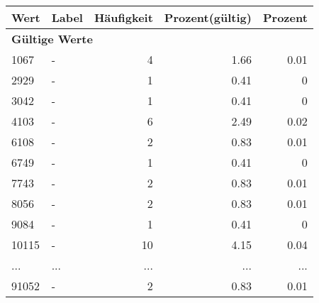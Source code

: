      \begin{longtable}{lXrrr}
     \toprule
     \textbf{Wert} & \textbf{Label} & \textbf{Häufigkeit} & \textbf{Prozent(gültig)} & \textbf{Prozent} \\
     \endhead
     \midrule
     \multicolumn{5}{l}{\textbf{Gültige Werte}}\\
        1067 & \multicolumn{1}{X}{-} & %
          \num{4} &
          \num[round-mode=places,round-precision=2]{1.66} &
          \num[round-mode=places,round-precision=2]{0.01} \\
        2929 & \multicolumn{1}{X}{-} & %
          \num{1} &
          \num[round-mode=places,round-precision=2]{0.41} &
          \num[round-mode=places,round-precision=2]{0} \\
        3042 & \multicolumn{1}{X}{-} & %
          \num{1} &
          \num[round-mode=places,round-precision=2]{0.41} &
          \num[round-mode=places,round-precision=2]{0} \\
        4103 & \multicolumn{1}{X}{-} & %
          \num{6} &
          \num[round-mode=places,round-precision=2]{2.49} &
          \num[round-mode=places,round-precision=2]{0.02} \\
        6108 & \multicolumn{1}{X}{-} & %
          \num{2} &
          \num[round-mode=places,round-precision=2]{0.83} &
          \num[round-mode=places,round-precision=2]{0.01} \\
        6749 & \multicolumn{1}{X}{-} & %
          \num{1} &
          \num[round-mode=places,round-precision=2]{0.41} &
          \num[round-mode=places,round-precision=2]{0} \\
        7743 & \multicolumn{1}{X}{-} & %
          \num{2} &
          \num[round-mode=places,round-precision=2]{0.83} &
          \num[round-mode=places,round-precision=2]{0.01} \\
        8056 & \multicolumn{1}{X}{-} & %
          \num{2} &
          \num[round-mode=places,round-precision=2]{0.83} &
          \num[round-mode=places,round-precision=2]{0.01} \\
        9084 & \multicolumn{1}{X}{-} & %
          \num{1} &
          \num[round-mode=places,round-precision=2]{0.41} &
          \num[round-mode=places,round-precision=2]{0} \\
        10115 & \multicolumn{1}{X}{-} & %
          \num{10} &
          \num[round-mode=places,round-precision=2]{4.15} &
          \num[round-mode=places,round-precision=2]{0.04} \\
       ... & ... & ... & ... & ... \\
        91052 & \multicolumn{1}{X}{-} & %
          \num{2} &
          \num[round-mode=places,round-precision=2]{0.83} &
          \num[round-mode=places,round-precision=2]{0.01} \\


\end{longtable}
